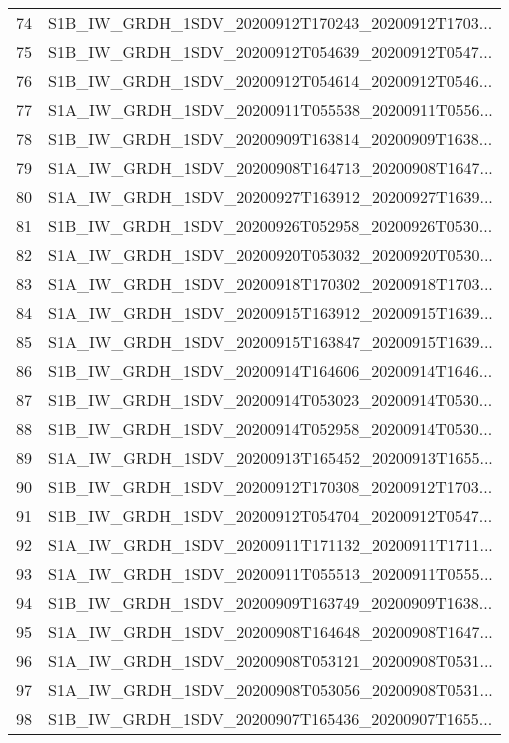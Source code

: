 \begin{tabular}{ll}
74  &  S1B\_IW\_GRDH\_1SDV\_20200912T170243\_20200912T1703... \\
75  &  S1B\_IW\_GRDH\_1SDV\_20200912T054639\_20200912T0547... \\
76  &  S1B\_IW\_GRDH\_1SDV\_20200912T054614\_20200912T0546... \\
77  &  S1A\_IW\_GRDH\_1SDV\_20200911T055538\_20200911T0556... \\
78  &  S1B\_IW\_GRDH\_1SDV\_20200909T163814\_20200909T1638... \\
79  &  S1A\_IW\_GRDH\_1SDV\_20200908T164713\_20200908T1647... \\
80  &  S1A\_IW\_GRDH\_1SDV\_20200927T163912\_20200927T1639... \\
81  &  S1B\_IW\_GRDH\_1SDV\_20200926T052958\_20200926T0530... \\
82  &  S1A\_IW\_GRDH\_1SDV\_20200920T053032\_20200920T0530... \\
83  &  S1A\_IW\_GRDH\_1SDV\_20200918T170302\_20200918T1703... \\
84  &  S1A\_IW\_GRDH\_1SDV\_20200915T163912\_20200915T1639... \\
85  &  S1A\_IW\_GRDH\_1SDV\_20200915T163847\_20200915T1639... \\
86  &  S1B\_IW\_GRDH\_1SDV\_20200914T164606\_20200914T1646... \\
87  &  S1B\_IW\_GRDH\_1SDV\_20200914T053023\_20200914T0530... \\
88  &  S1B\_IW\_GRDH\_1SDV\_20200914T052958\_20200914T0530... \\
89  &  S1A\_IW\_GRDH\_1SDV\_20200913T165452\_20200913T1655... \\
90  &  S1B\_IW\_GRDH\_1SDV\_20200912T170308\_20200912T1703... \\
91  &  S1B\_IW\_GRDH\_1SDV\_20200912T054704\_20200912T0547... \\
92  &  S1A\_IW\_GRDH\_1SDV\_20200911T171132\_20200911T1711... \\
93  &  S1A\_IW\_GRDH\_1SDV\_20200911T055513\_20200911T0555... \\
94  &  S1B\_IW\_GRDH\_1SDV\_20200909T163749\_20200909T1638... \\
95  &  S1A\_IW\_GRDH\_1SDV\_20200908T164648\_20200908T1647... \\
96  &  S1A\_IW\_GRDH\_1SDV\_20200908T053121\_20200908T0531... \\
97  &  S1A\_IW\_GRDH\_1SDV\_20200908T053056\_20200908T0531... \\
98  &  S1B\_IW\_GRDH\_1SDV\_20200907T165436\_20200907T1655... \\

\end{tabular}

